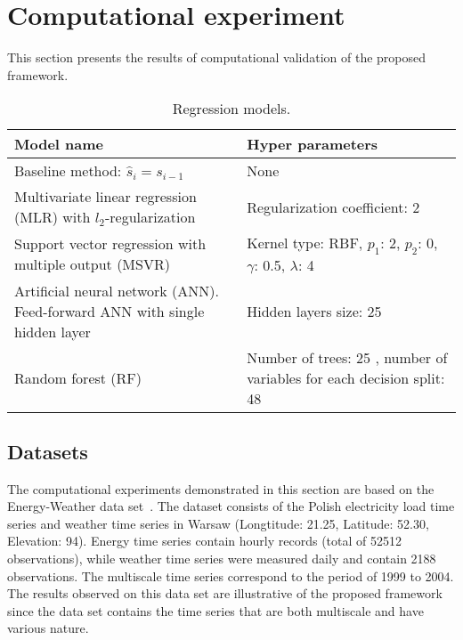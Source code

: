 \documentclass[conference]{IEEEtran}
\begin{document}
\section{Computational experiment}
This section presents the results of computational validation of the proposed framework.
\begin{table}\caption{Regression models.}\label{tb:regr_mdl}
\begin{tabular}{|p{4cm}|p{4cm}|}
\hline
Model name & Hyper parameters \\
\hline
Baseline method: $\hat{s}_i = s_{i-1}$ & None \\
\hline
 Multivariate linear regression (MLR) with $l_2$-regularization & Regularization coefficient: 2 \\
 \hline
Support vector regression with multiple output (MSVR) & Kernel type: RBF, $p_1$: 2, $p_2$: 0, $\gamma$: 0.5, $\lambda$: 4 \\
\hline
Artificial neural network (ANN). Feed-forward ANN with single hidden layer  &  Hidden layers size: 25 \\
\hline Random forest (RF) & Number of trees: 25 , number of variables for each decision split: 48\\
\hline
\end{tabular}
\end{table}
\subsection{Datasets}
The computational experiments demonstrated in this section are based on the Energy-Weather data set~\cite{EnergyWeatherData}. The dataset consists of the Polish electricity load time series and weather time series in Warsaw (Longtitude: 21.25, Latitude: 52.30, Elevation: 94). Energy time series contain hourly records (total of 52512 observations), while weather time series were measured daily and contain 2188 observations. The multiscale time series correspond to the period of 1999 to 2004. The results observed on this data set  are illustrative of the proposed framework since the data set contains the time series that are both multiscale and have various nature.
\end{document}
